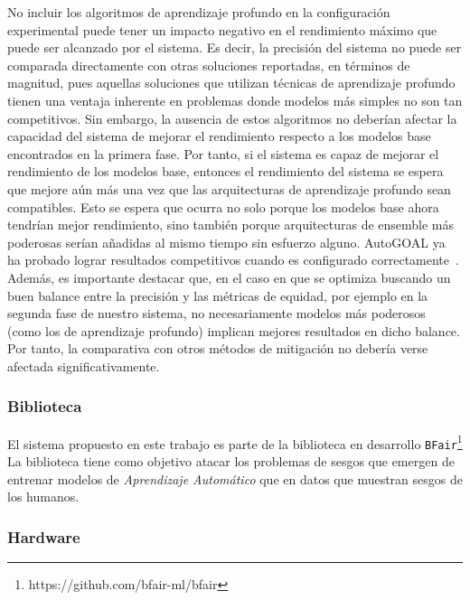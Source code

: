 No incluir los algoritmos de aprendizaje profundo en la configuración experimental puede tener un impacto negativo en el rendimiento máximo que puede ser alcanzado por el sistema.
Es decir, la precisión del sistema no puede ser comparada directamente con otras soluciones reportadas, en términos de magnitud, pues aquellas soluciones que utilizan técnicas de aprendizaje profundo tienen una ventaja inherente en problemas donde modelos más simples no son tan competitivos.
Sin embargo, la ausencia de estos algoritmos no deberían afectar la capacidad del sistema de mejorar el rendimiento respecto a los modelos base encontrados en la primera fase.
Por tanto, si el sistema es capaz de mejorar el rendimiento de los modelos base, entonces el rendimiento del sistema se espera que mejore aún más una vez que las arquitecturas de aprendizaje profundo sean compatibles.
Esto se espera que ocurra no solo porque los modelos base ahora tendrían mejor rendimiento, sino también porque arquitecturas de ensemble más poderosas serían añadidas al mismo tiempo sin esfuerzo alguno.
AutoGOAL ya ha probado lograr resultados competitivos cuando es configurado correctamente~\parencite{estevez2020automatic}.
Además, es importante destacar que, en el caso en que se optimiza buscando un buen balance entre la precisión y las métricas de equidad, por ejemplo en la segunda fase de nuestro sistema, no necesariamente modelos más poderosos (como los de aprendizaje profundo) implican mejores resultados en dicho balance.
Por tanto, la comparativa con otros métodos de mitigación no debería verse afectada significativamente.

\subsubsection{Biblioteca}\label{section:library}

El sistema propuesto en este trabajo es parte de la biblioteca en desarrollo \texttt{BFair}\footnote{https://github.com/bfair-ml/bfair}
La biblioteca tiene como objetivo atacar los problemas de sesgos que emergen de entrenar modelos de \emph{Aprendizaje Automático} que en datos que muestran sesgos de los humanos.


\subsubsection{Hardware}\label{section:hardware}

